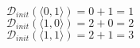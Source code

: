 
\vfill
{}
$$\mathcal{D}_{init} (\langle 0,1 \rangle)=0+1=1$$
$$\mathcal{D}_{init} (\langle 1,0 \rangle)=2+0=2$$
$$\mathcal{D}_{init} (\langle 1,1 \rangle)=2+1=3$$

\vfill
